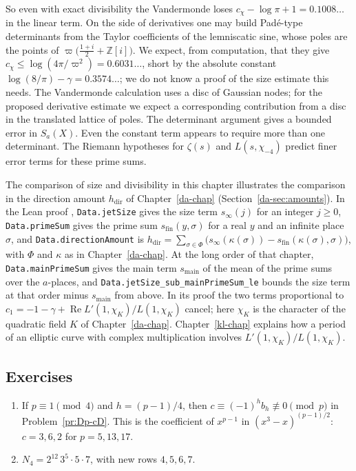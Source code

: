 \documentclass[reqno]{amsart}
\newcounter{chap}
\theoremstyle{definition}
\theoremstyle{plain}
\newcommand{\Z}{\mathbb{Z}}
\newcommand{\Zi}{\Z[i]}
\begin{document}
So even with exact divisibility the Vandermonde loses \(c_\chi - \log\pi + 1 = 0.1008\ldots\) in the linear term.  On the side of derivatives one may build Padé-type determinants from the Taylor coefficients of the lemniscatic sine, whose poles are the points of \(\varpi\bigl(\frac{1+i}2 + \Zi\bigr)\).  We expect, from computation, that they give \(c_\chi \le \log(4\pi/\varpi^2) = 0.6031\ldots\), short by the absolute constant \(\log(8/\pi) - \gamma = 0.3574\ldots\); we do not know a proof of the size estimate this needs.  The Vandermonde calculation uses a disc of Gaussian nodes; for the proposed derivative estimate we expect a corresponding contribution from a disc in the translated lattice of poles.  The determinant argument gives a bounded error in \(S_a(X)\).  Even the constant term appears to require more than one determinant.  The Riemann hypotheses for \(\zeta(s)\) and \(L(s,\chi_{-4})\) predict finer error terms for these prime sums.

The comparison of size and divisibility in this chapter illustrates the comparison in the direction amount \(h_{\mathrm{dir}}\) of Chapter~\ref{da-chap} (Section~\ref{da-sec:amounts}).  In the Lean proof \cite{GL}, \texttt{Data.\allowbreak jetSize} gives the size term \(s_\infty(j)\) for an integer \(j \ge 0\), \texttt{Data.\allowbreak primeSum} gives the prime sum \(s_{\mathrm{fin}}(y, \sigma)\) for a real \(y\) and an infinite place \(\sigma\), and \texttt{Data.\allowbreak directionAmount} is \(h_{\mathrm{dir}} = \sum_{\sigma \in \Phi} \bigl(s_\infty(\kappa(\sigma)) - s_{\mathrm{fin}}(\kappa(\sigma), \sigma)\bigr)\), with \(\Phi\) and \(\kappa\) as in Chapter~\ref{da-chap}.  At the long order of that chapter, \texttt{Data.\allowbreak mainPrimeSum} gives the main term \(s_{\mathrm{main}}\) of the mean of the prime sums over the \(a\)-places, and \texttt{Data.\allowbreak jetSize\_sub\_mainPrimeSum\_le} bounds the size term at that order minus \(s_{\mathrm{main}}\) from above.  In its proof the two terms proportional to \(c_1 = -1 - \gamma + \operatorname{Re} L'(1, \chi_K)/L(1, \chi_K)\) cancel; here \(\chi_K\) is the character of the quadratic field \(K\) of Chapter~\ref{da-chap}.  Chapter~\ref{kl-chap} explains how a period of an elliptic curve with complex multiplication involves \(L'(1, \chi_K)/L(1, \chi_K)\).

\subsection*{Exercises}

\begin{enumerate}
\item If \(p \equiv 1 \pmod 4\) and \(h = (p-1)/4\), then \(c \equiv (-1)^h b_h \not\equiv 0 \pmod p\) in Problem~\ref{pr:Dp-cD}.  This is the coefficient of \(x^{p-1}\) in \((x^3 - x)^{(p-1)/2}\): \(c = 3, 6, 2\) for \(p = 5, 13, 17\).
\item \(N_4 = 2^{12}\, 3^5 \cdot 5 \cdot 7\), with new rows \(4, 5, 6, 7\).
\end{enumerate}
\end{document}
